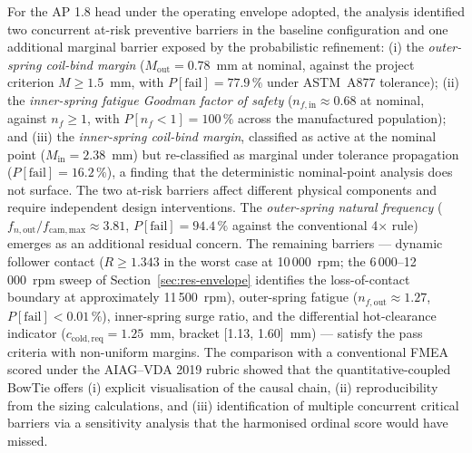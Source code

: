 For the AP 1.8 head under the operating envelope adopted, the analysis
identified two concurrent at-risk preventive barriers in the baseline
configuration and one additional marginal barrier exposed by the
probabilistic refinement:
(i) the \emph{outer-spring coil-bind margin}
($M_{\mathrm{out}}=0.78$~mm at nominal, against the project criterion
$M\geq 1.5$~mm, with $P[\mathrm{fail}]=77.9\,\%$ under ASTM~A877
tolerance);
(ii) the \emph{inner-spring fatigue Goodman factor of safety}
($n_{f,\mathrm{in}}\approx 0.68$ at nominal, against $n_{f}\geq 1$,
with $P[n_{f}<1]=100\,\%$ across the manufactured population); and
(iii) the \emph{inner-spring coil-bind margin}, classified as
active at the nominal point ($M_{\mathrm{in}}=2.38$~mm) but
re-classified as marginal under tolerance propagation
($P[\mathrm{fail}]=16.2\,\%$), a finding that the deterministic
nominal-point analysis does not surface. The two at-risk barriers
affect different physical components and require independent design
interventions. The \emph{outer-spring natural frequency}
($f_{n,\mathrm{out}}/f_{\mathrm{cam,max}}\approx 3.81$,
$P[\mathrm{fail}]=94.4\,\%$ against the conventional 4$\times$
rule) emerges as an additional residual concern. The remaining
barriers --- dynamic follower contact
($R\geq 1.343$ in the worst case at 10\,000~rpm; the
6\,000--12\,000~rpm sweep of Section~\ref{sec:res-envelope}
identifies the loss-of-contact boundary at approximately
11\,500~rpm), outer-spring fatigue ($n_{f,\mathrm{out}}\approx 1.27$,
$P[\mathrm{fail}]<0.01\,\%$), inner-spring surge ratio, and the
differential hot-clearance indicator
($c_{\mathrm{cold,req}}=1.25$~mm, bracket [1.13, 1.60]~mm) ---
satisfy the pass criteria with non-uniform margins. The comparison
with a conventional FMEA scored under the AIAG--VDA 2019 rubric
showed that the quantitative-coupled BowTie offers (i) explicit
visualisation of the causal chain, (ii) reproducibility from the
sizing calculations, and (iii) identification of multiple concurrent
critical barriers via a sensitivity analysis that the harmonised
ordinal score would have missed.

